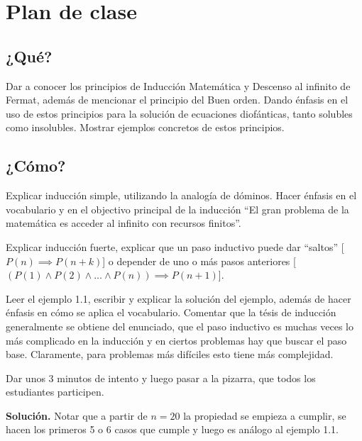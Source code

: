 \newpage
\section{Plan de clase}

\subsection{¿Qué?}

Dar a conocer los principios de Inducción Matemática y Descenso al infinito de Fermat, además de mencionar el principio del Buen orden.
Dando énfasis en el uso de estos principios para la solución de ecuaciones diofánticas, tanto solubles como insolubles.
Mostrar ejemplos concretos de estos principios.

\subsection{¿Cómo?}

\begin{activity}[*][8 min]
    Explicar inducción simple, utilizando la analogía de dóminos.
    Hacer énfasis en el vocabulario y en el objectivo principal de la inducción ``El gran problema de la matemática es acceder al infinito con recursos finitos''.
\end{activity}

\begin{activity}[*][10 min]
    Explicar inducción fuerte, explicar que un paso inductivo puede dar ``saltos'' [$P(n) \implies P(n + k)$] o
    depender de uno o más pasos anteriores [$\left(P(1) \land P(2) \land \ldots \land P(n)\right) \implies P(n + 1)$].
\end{activity}

\begin{activity}[Ejemplo 1.1][15 min]
    Leer el ejemplo 1.1, escribir y explicar la solución del ejemplo, además de hacer énfasis en cómo se aplica el vocabulario.
    Comentar que la tésis de inducción generalmente se obtiene del enunciado, que el paso inductivo es muchas veces lo
    más complicado en la inducción y en ciertos problemas hay que buscar el paso base.
    Claramente, para problemas más difíciles esto tiene más complejidad.
\end{activity}

\begin{activity}[Ejercicio 1][10 min]
    Dar unos 3 minutos de intento y luego pasar a la pizarra, que todos los estudiantes participen.
    \par\hspace{5mm}\textbf{Solución.}
    Notar que a partir de $n = 20$ la propiedad se empieza a cumplir, se hacen los primeros 5 o 6 casos que cumple y
    luego es análogo al ejemplo 1.1.
\end{activity}

